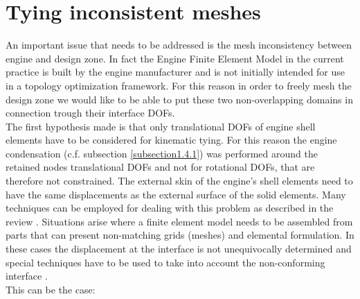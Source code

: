 \section{Tying inconsistent meshes}
\label{sec1.3}
An important issue that needs to be addressed is the mesh inconsistency between engine and design zone. In fact the Engine Finite Element Model in the current practice is built by the engine manufacturer and is not initially intended for use in a topology optimization framework. For this reason in order to freely mesh the design zone we would like to be able to put these two non-overlapping domains in connection trough their interface DOFs.\\
 The first hypothesis made is that only translational DOFs of engine shell elements have to be considered for kinematic tying. For this reason the engine condensation (c.f. subsection \ref{subsection1.4.1}) was performed around the retained nodes translational DOFs and not for rotational DOFs, that are therefore not constrained. The external skin of the engine's shell elements need to have the same displacements as the external surface of the solid elements. Many techniques can be employed for dealing with this problem as described in the review \cite{coniglio2018weighted}. Situations arise where a finite element model needs to be assembled from parts that can present non-matching grids (meshes) and elemental formulation. In these cases the displacement at the interface is not unequivocally determined and special techniques have to be used to take into account the non-conforming interface \cite{mcgee2005non}. \\
 This can be the case:
